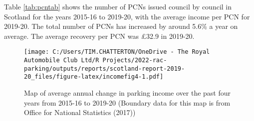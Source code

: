 \documentclass[
  12pt,
]{article}
\begin{document}
Table \ref{tab:pcntab} shows the number of PCNs issued council by council in Scotland for the years 2015-16 to 2019-20, with the average income per PCN for 2019-20. The total number of PCNs has increased by around 5.6\% a year on average. The average recovery per PCN was £32.9 in 2019-20.

\begin{figure}
\centering
\texttt{[image: C:/Users/TIM.CHATTERTON/OneDrive - The Royal Automobile Club Ltd/R Projects/2022-rac-parking/outputs/reports/scotland-report-2019-20\_files/figure-latex/incomefig4-1.pdf]}
\caption{\label{fig:incomefig4}Map of average annual change in parking income over the past four years from 2015-16 to 2019-20 (Boundary data for this map is from Office for National Statistics (2017))}
\end{figure}

\newpage

\pagebreak

\begingroup\fontsize{10}{12}\selectfont
\end{document}
